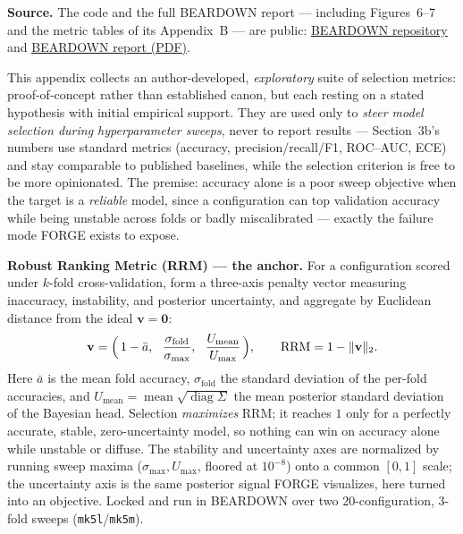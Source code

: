 \documentclass[11pt]{article}
\newcommand{\urllink}[2]{\href{#1}{\textcolor{urlblue}{\underline{#2}}}}
\begin{document}
\noindent\textbf{Source.} The code and the full BEARDOWN report --- including Figures~6--7 and the metric tables of its Appendix~B --- are public: \urllink{https://github.com/N-Herling-Mk1/INFO_510_Fa25_Final_Proj}{BEARDOWN repository} and \urllink{https://github.com/N-Herling-Mk1/INFO_510_Fa25_Final_Proj/blob/main/_docs/INFO_510_FA_25_Final_Project_Group_7.pdf}{BEARDOWN report (PDF)}.

\smallskip
This appendix collects an author-developed, \emph{exploratory} suite of selection metrics: proof-of-concept rather than established canon, but each resting on a stated hypothesis with initial empirical support. They are used only to \emph{steer model selection during hyperparameter sweeps}, never to report results --- Section~3b's numbers use standard metrics (accuracy, precision/recall/F1, ROC--AUC, ECE) and stay comparable to published baselines, while the selection criterion is free to be more opinionated. The premise: accuracy alone is a poor sweep objective when the target is a \emph{reliable} model, since a configuration can top validation accuracy while being unstable across folds or badly miscalibrated --- exactly the failure mode FORGE exists to expose.

\smallskip
\noindent\textbf{Robust Ranking Metric (RRM) --- the anchor.} For a configuration scored under $k$-fold cross-validation, form a three-axis penalty vector measuring inaccuracy, instability, and posterior uncertainty, and aggregate by Euclidean distance from the ideal $\mathbf{v}=\mathbf{0}$:
\[
  \mathbf{v}=\Bigl(\,1-\bar{a},\ \ \frac{\sigma_{\mathrm{fold}}}{\sigma_{\max}},\ \ \frac{U_{\mathrm{mean}}}{U_{\max}}\,\Bigr),
  \qquad
  \mathrm{RRM} = 1-\lVert\mathbf{v}\rVert_2 .
\]
Here $\bar{a}$ is the mean fold accuracy, $\sigma_{\mathrm{fold}}$ the standard deviation of the per-fold accuracies, and $U_{\mathrm{mean}}=\operatorname{mean}\sqrt{\operatorname{diag}\Sigma}$ the mean posterior standard deviation of the Bayesian head. Selection \emph{maximizes} RRM; it reaches $1$ only for a perfectly accurate, stable, zero-uncertainty model, so nothing can win on accuracy alone while unstable or diffuse. The stability and uncertainty axes are normalized by running sweep maxima ($\sigma_{\max},U_{\max}$, floored at $10^{-8}$) onto a common $[0,1]$ scale; the uncertainty axis is the same posterior signal FORGE visualizes, here turned into an objective. Locked and run in BEARDOWN over two 20-configuration, 3-fold sweeps (\texttt{mk5l}/\texttt{mk5m}).
\end{document}
